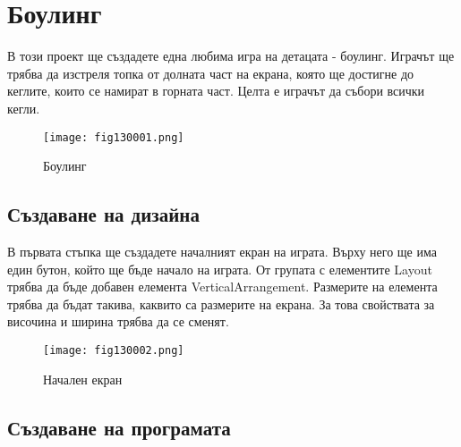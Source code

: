 \chapter{Боулинг}

В този проект ще създадете една любима игра на детацата - боулинг. Играчът ще трябва да изстреля топка от долната част на екрана, която ще достигне до кеглите, които се намират в горната част. Целта е играчът да събори всички кегли.

\begin{figure}[H]
  \centering
  \texttt{[image: fig130001.png]}
  \caption{Боулинг}
\label{fig130001}
\end{figure}

\section{Създаване на дизайна}

В първата стъпка ще създадете началният екран на играта. Върху него ще има един бутон, който ще бъде начало на играта. От групата с елементите Layout трябва да бъде добавен елемента VerticalArrangement. Размерите на елемента трябва да бъдат такива, каквито са размерите на екрана. За това свойствата за височина и ширина трябва да се сменят.

\begin{figure}[H]
  \centering
  \texttt{[image: fig130002.png]}
  \caption{Начален екран}
\label{fig130002}
\end{figure}

\section{Създаване на програмата}
